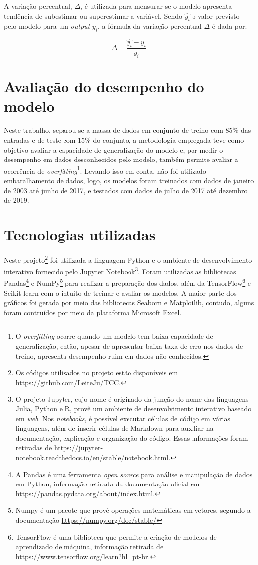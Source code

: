 A variação percentual, $\Delta$, é utilizada para mensurar se o 
modelo apresenta tendência de subestimar ou superestimar a variável. 
Sendo $\hat{y_i}$ o valor previsto pelo 
modelo para um \textit{output} $y_i$, a fórmula da variação percentual
$\Delta$ é dada por:

\begin{equation}
    \Delta = \frac{\hat{y_i} - y_i}{y_i}
\end{equation}

\section{Avaliação do desempenho do modelo}

Neste trabalho, separou-se a massa de dados em conjunto de treino com 85\% 
das entradas e de teste com 15\% do conjunto, a metodologia empregada teve como objetivo avaliar
a capacidade de generalização do modelo e, por medir o desempenho em dados 
desconhecidos pelo modelo, também permite avaliar a ocorrência de \textit{overfitting}\footnote{
O \textit{overfitting} ocorre quando um modelo tem baixa capacidade de generalização, 
então, apesar de apresentar baixa taxa de erro nos dados de treino, apresenta 
desempenho ruim em dados não conhecidos.}. Levando isso em conta, não foi utilizado embaralhamento de dados, 
logo, os modelos foram treinados com dados de janeiro de 2003 até junho de 2017,
e testados com dados de julho de 2017 até dezembro de 2019.

\section{Tecnologias utilizadas}

Neste projeto\footnote{Os códigos utilizados no projeto estão disponíveis em \url{https://github.com/LeiteJu/TCC}.} foi utilizada a linguagem Python e  o ambiente de desenvolvimento interativo fornecido pelo Jupyter Notebook\footnote{O projeto Jupyter, cujo nome é originado da junção do nome das linguagens Julia, Python e R, provê um 
ambiente de desenvolvimento interativo baseado em \textit{web}. Nos \textit{notebooks}, é possível executar células de código 
em várias linguagens, além de inserir células de Markdown para auxiliar na documentação, explicação e organização do código. Essas informações foram 
retiradas de \url{https://jupyter-notebook.readthedocs.io/en/stable/notebook.html}.}.
Foram utilizadas as bibliotecas Pandas\footnote{A Pandas é uma ferramenta \textit{open source} para análise e manipulação de dados em Python, informação retirada da documentação oficial em \url{https://pandas.pydata.org/about/index.html}.} e NumPy\footnote{
Numpy é um pacote que provê operações matemáticas em vetores, segundo a documentação \url{https://numpy.org/doc/stable/}
} para realizar a preparação dos dados,
além da TensorFlow\footnote{TensorFlow é uma biblioteca que permite a criação de modelos de aprendizado de máquina, informação retirada de \url{https://www.tensorflow.org/learn?hl=pt-br}.} e Scikit-learn com o intuito de treinar e avaliar os modelos.
A maior parte dos gráficos foi gerada por meio das bibliotecas 
Seaborn e Matplotlib, contudo, alguns foram contruídos por meio da plataforma
Microsoft Excel.
